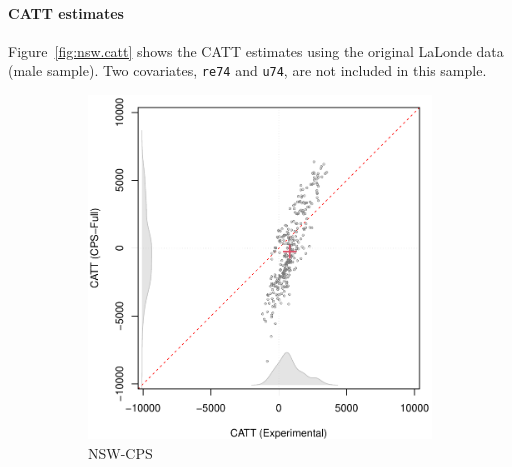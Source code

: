 \documentclass[letterpaper,12pt,leqno]{article}
\begin{document}
\clearpage


\paragraph{CATT estimates}  Figure~\ref{fig:nsw.catt} shows the CATT estimates using the original LaLonde data (male sample). Two covariates, \texttt{re74} and \texttt{u74}, are not included in this sample.

\begin{figure}[!ht]
    \caption{CATT Estimates for the LaLonde Data (Male Sample)}\label{fig:nsw.catt}
    \centering
    \begin{minipage}[c]{1\textwidth}
        \centering
        \begin{subfigure}{0.4\linewidth}
            \includegraphics[width=\linewidth]{catt_nsw_cps.pdf}
            \caption{NSW-CPS}
        \end{subfigure}
        \begin{subfigure}{0.4\linewidth}

\end{subfigure}
\end{minipage}
\end{figure}
\end{document}
